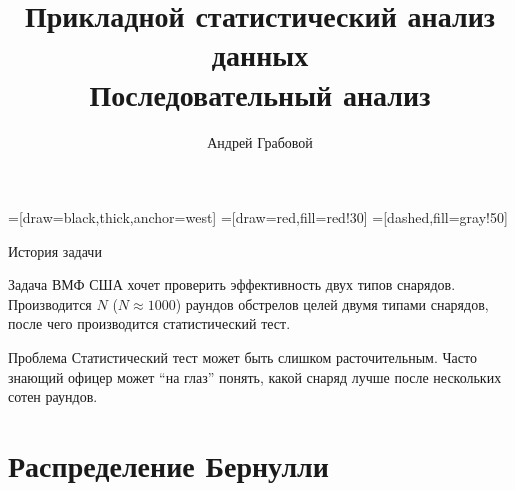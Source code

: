 \documentclass[9pt,pdf,utf8,hyperref={unicode},aspectratio=169]{beamer}
\title[Причинность]{Прикладной статистический анализ данных\\Последовательный анализ}
\author{Андрей Грабовой}
\date{}
\begin{document}
=[draw=black,thick,anchor=west]
=[draw=red,fill=red!30]
=[dashed,fill=gray!50]

\begin{frame}
    \titlepage
\end{frame}

\begin{frame}{История задачи}
\begin{block}{Задача}
ВМФ США хочет проверить эффективность двух типов снарядов. Производится $N$ ($N \approx 1000$) раундов обстрелов целей двумя типами снарядов, после чего производится статистический тест.
\end{block}

\begin{block}{Проблема}
Статистический тест может быть слишком расточительным. Часто знающий офицер может ``на глаз'' понять, какой снаряд лучше после нескольких сотен раундов.
\end{block}

\end{frame}

\section{Распределение Бернулли}
\end{document}
